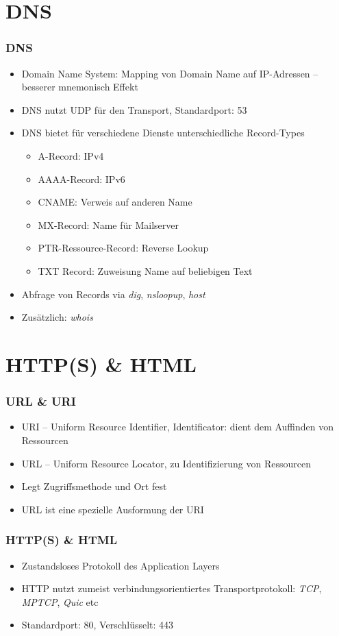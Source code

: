 \documentclass[xcolor=dvipsnames, aspectratio=169]{beamer}
\begin{document}
\section{DNS}
\begin{frame}
	\frametitle{DNS}
	\begin{itemize}
		\item Domain Name System: Mapping von Domain Name auf IP-Adressen -- besserer mnemonisch Effekt
		\item DNS nutzt UDP für den Transport, Standardport: 53
		\item DNS bietet für verschiedene Dienste unterschiedliche Record-Types
		\begin{multicols}{2}
		\begin{itemize}
			\item A-Record: IPv4 
			\item AAAA-Record: IPv6
			\item CNAME: Verweis auf anderen Name
			\item MX-Record: Name für Mailserver
			\item PTR-Ressource-Record: Reverse Lookup
			\item TXT Record: Zuweisung Name auf beliebigen Text
		\end{itemize}
		\end{multicols}
		\item Abfrage von Records via \emph{dig}, \emph{nsloopup}, \emph{host}
		\item Zusätzlich: \emph{whois}
	\end{itemize}
\end{frame}

\section{HTTP(S) \& HTML}
\begin{frame}
	\frametitle{URL \& URI}
	\begin{itemize}
		\item URI -- Uniform Resource Identifier, Identificator: dient dem Auffinden von Ressourcen
		\item URL -- Uniform Resource Locator, zu Identifizierung von Ressourcen
		\item Legt Zugriffsmethode und Ort fest
		\item URL ist eine spezielle Ausformung der URI
	\end{itemize}
\end{frame}

\begin{frame}
	\frametitle{HTTP(S) \& HTML}
	\begin{itemize}
		\item Zustandsloses Protokoll des Application Layers
		\item HTTP nutzt zumeist verbindungsorientiertes Transportprotokoll: \emph{TCP}, \emph{MPTCP}, \emph{Quic} etc
		\item Standardport: 80, Verschlüsselt: 443
	\end{itemize}
\end{frame}
\end{document}
